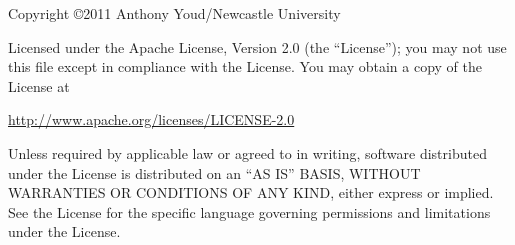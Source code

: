 %
%
%

\begin{licence}
  \begin{center}
    Copyright \copyright 2011 Anthony Youd/Newcastle University
  \end{center}

  \noindent Licensed under the Apache License, Version 2.0 (the ``License'');
  you may not use this file except in compliance with the License.  You may
  obtain a copy of the License at

  \begin{center}
    \url{http://www.apache.org/licenses/LICENSE-2.0}
  \end{center}

  \noindent Unless required by applicable law or agreed to in writing, software
  distributed under the License is distributed on an ``AS IS'' BASIS, WITHOUT
  WARRANTIES OR CONDITIONS OF ANY KIND, either express or implied.  See the
  License for the specific language governing permissions and limitations under
  the License.
\end{licence}
\thispagestyle{empty}
\cleardoublepage

